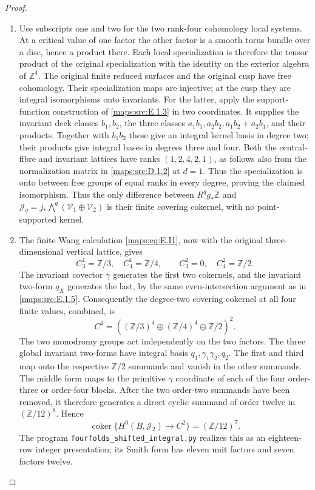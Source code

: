 \begin{proof}
\begin{enumerate}[label=\arabic*.,leftmargin=*]
\item Use subscripts one and two for the two rank-four cohomology
local systems. At a critical value of one factor the other
factor is a smooth torus bundle over a disc, hence a product
there. Each local specialization is therefore the tensor
product of the original specialization with the identity on
the exterior algebra of \(\mathbb Z^4\). The original finite
reduced surfaces and the original cusp have free cohomology.
Their specialization maps are injective; at the cusp they
are integral isomorphisms onto invariants. For the latter,
apply the support-function construction of \ref{maps:src:E.1.3} in two
coordinates. It supplies the invariant deck classes
\(b_1,b_2\), the three classes
\(a_1b_1,a_2b_2,a_1b_2+a_2b_1\), and their products.
Together with \(b_1b_2\) these give an integral kernel
basis in degree two; their products give integral bases
in degrees three and four. Both the central-fibre and
invariant lattices have ranks \((1,2,4,2,1)\), as follows
also from the normalization matrix in \ref{maps:src:D.1.2} at \(d=1\).
Thus the specialization is onto between free groups of
equal ranks in every degree, proving the claimed isomorphism.
Thus the only difference between \(R^qg_*\mathbb Z\) and
\(\mathcal J_q=j_*\bigwedge^q(\mathcal V_1\oplus\mathcal V_2)\)
is their finite covering cokernel, with no point-supported kernel.

\item The finite Wang calculation \eqref{maps:eq:E.I1}, now with the original
three-dimensional vertical lattice, gives
\[
 C_3^1=\mathbb Z/3,\quad C_4^1=\mathbb Z/4,
 \qquad C_3^2=0,\quad C_4^2=\mathbb Z/2.
\]
The invariant covector \(\gamma\) generates the first two
cokernels, and the invariant two-form \(q_X\) generates the
last, by the same even-intersection argument as in \ref{maps:src:E.1.5}.
Consequently the degree-two covering cokernel at all four
finite values, combined, is
\[
 C^2=\left((\mathbb Z/3)^4\oplus
                 (\mathbb Z/4)^4\oplus\mathbb Z/2\right)^2.
\]
The two monodromy groups act independently on the two factors.
The three global invariant two-forms have integral basis
\(q_1,\gamma_1\gamma_2,q_2\). The first and third map
onto the respective \(\mathbb Z/2\) summands and vanish
in the other summands. The middle form maps to the primitive
\(\gamma\) coordinate of each of the four order-three or
order-four blocks. After the two order-two summands have
been removed, it therefore generates a direct cyclic summand
of order twelve in \((\mathbb Z/12)^8\). Hence
\[
 \operatorname{coker}\{H^0(B,\mathcal J_2)\to C^2\}
      =(\mathbb Z/12)^7.
 \tag{E.20}\label{maps:eq:E.20}
\]
The program \texttt{fourfolds\_shifted\_integral.py} realizes
this as an eighteen-row integer presentation; its Smith form
has eleven unit factors and seven factors twelve.


\end{enumerate}
\end{proof}
